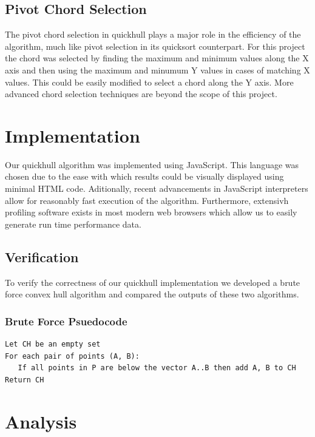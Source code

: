 \documentclass[11pt]{article}
\begin{document}
\subsection{Pivot Chord Selection}
The pivot chord selection in quickhull plays a major role in the efficiency of the algorithm, much like pivot selection in its quicksort counterpart. For this project the chord was selected by finding the maximum and minimum values along the X axis and then using the maximum and minumum Y values in cases of matching X values. This could be easily modified to select a chord along the Y axis. More advanced chord selection techniques are beyond the scope of this project.

\section{Implementation}
Our quickhull algorithm was implemented using JavaScript. This language was chosen due to the ease with which results could be visually displayed using minimal HTML code. Aditionally, recent advancements in JavaScript interpreters allow for reasonably fast execution of the algorithm. Furthermore, extensivh profiling software exists in most modern web browsers which allow us to easily generate run time performance data.

\subsection{Verification}
To verify the correctness of our quickhull implementation we developed a brute force convex hull algorithm and compared the outputs of these two algorithms.

\subsubsection{Brute Force Psuedocode}
\begin{verbatim}
Let CH be an empty set
For each pair of points (A, B):
   If all points in P are below the vector A..B then add A, B to CH
Return CH
\end{verbatim}

\section{Analysis}
\end{document}
